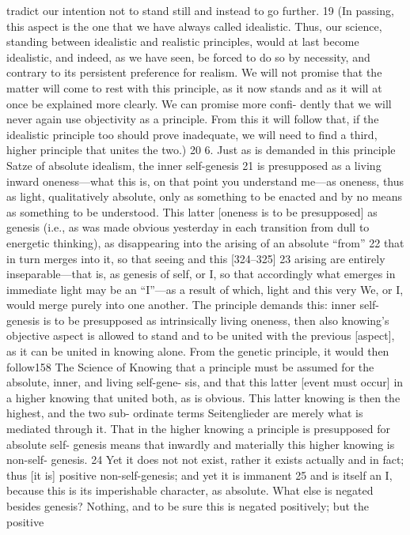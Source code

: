 tradict our intention not to stand still and instead to go further. 19
(In passing, this aspect is the one that we have always called idealistic.
Thus, our science, standing between idealistic and realistic principles, would
at last become idealistic, and indeed, as we have seen, be forced to do so by
necessity, and contrary to its persistent preference for realism. We will not
promise that the matter will come to rest with this principle, as it now stands
and as it will at once be explained more clearly. We can promise more confi-
dently that we will never again use objectivity as a principle. From this it will
follow that, if the idealistic principle too should prove inadequate, we will
need to find a third, higher principle that unites the two.) 20
6. Just as is demanded in this principle {Satze} of absolute idealism, the
inner self-genesis 21 is presupposed as a living inward oneness—what this is, on
that point you understand me—as oneness, thus as light, qualitatively
absolute, only as something to be enacted and by no means as something to
be understood. This latter [oneness is to be presupposed] as genesis (i.e., as was
made obvious yesterday in each transition from dull to energetic thinking), as
disappearing into the arising of an absolute “from” 22 that in turn merges into
it, so that seeing and this [324–325] 23 arising are entirely inseparable—that is,
as genesis of self, or I, so that accordingly what emerges in immediate light
may be an “I”—as a result of which, light and this very We, or I, would merge
purely into one another. The principle demands this: inner self-genesis is to
be presupposed as intrinsically living oneness, then also knowing’s objective
aspect is allowed to stand and to be united with the previous [aspect], as it can
be united in knowing alone. From the genetic principle, it would then follow158
The Science of Knowing
that a principle must be assumed for the absolute, inner, and living self-gene-
sis, and that this latter [event must occur] in a higher knowing that united
both, as is obvious. This latter knowing is then the highest, and the two sub-
ordinate terms {Seitenglieder} are merely what is mediated through it.
That in the higher knowing a principle is presupposed for absolute self-
genesis means that inwardly and materially this higher knowing is non-self-
genesis. 24 Yet it does not not exist, rather it exists actually and in fact; thus [it
is] positive non-self-genesis; and yet it is immanent 25 and is itself an I, because
this is its imperishable character, as absolute. What else is negated besides
genesis? Nothing, and to be sure this is negated positively; but the positive
